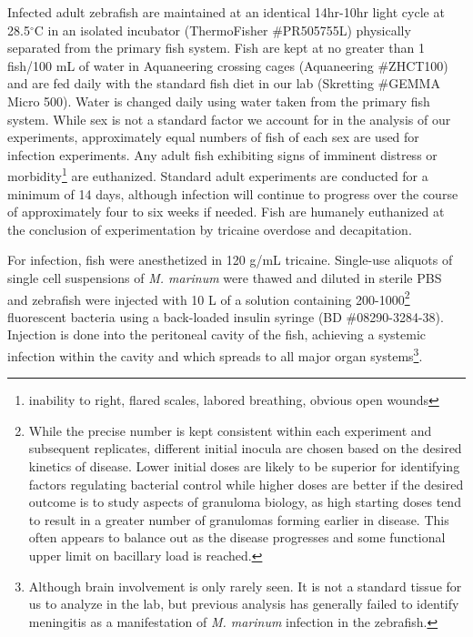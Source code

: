 Infected adult zebrafish are maintained at an identical 14hr-10hr light cycle at 28.5$^{\circ}$C in an isolated incubator (ThermoFisher \#PR505755L) physically separated from the primary fish system. Fish are kept at no greater than 1 fish/100 mL of water in Aquaneering crossing cages (Aquaneering \#ZHCT100) and are fed daily with the standard fish diet in our lab (Skretting \#GEMMA Micro 500). Water is changed daily using water taken from the primary fish system. While sex is not a standard factor we account for in the analysis of our experiments, approximately equal numbers of fish of each sex are used for infection experiments. Any adult fish exhibiting signs of imminent distress or morbidity\footnote{inability to right, flared scales, labored breathing, obvious open wounds} are euthanized. Standard adult experiments are conducted for a minimum of 14 days, although infection will continue to progress over the course of approximately four to six weeks if needed. Fish are humanely euthanized at the conclusion of experimentation by tricaine overdose and decapitation.

For infection, fish were anesthetized in 120 \textmu g/mL tricaine. Single-use aliquots of single cell suspensions of \textit{M. marinum} were thawed and diluted in sterile PBS and zebrafish were injected with 10 \textmu L of a solution containing 200-1000\footnote{While the precise number is kept consistent within each experiment and subsequent replicates, different initial inocula are chosen based on the desired kinetics of disease. Lower initial doses are likely to be superior for identifying factors regulating bacterial control while higher doses are better if the desired outcome is to study aspects of granuloma biology, as high starting doses tend to result in a greater number of granulomas forming earlier in disease. This often appears to balance out as the disease progresses and some functional upper limit on bacillary load is reached.} fluorescent bacteria using a back-loaded insulin syringe (BD \#08290-3284-38). Injection is done into the peritoneal cavity of the fish, achieving a systemic infection within the cavity and which spreads to all major organ systems\footnote{Although brain involvement is only rarely seen. It is not a standard tissue for us to analyze in the lab, but previous analysis has generally failed to identify meningitis as a manifestation of \textit{M. marinum} infection in the zebrafish.}. 

